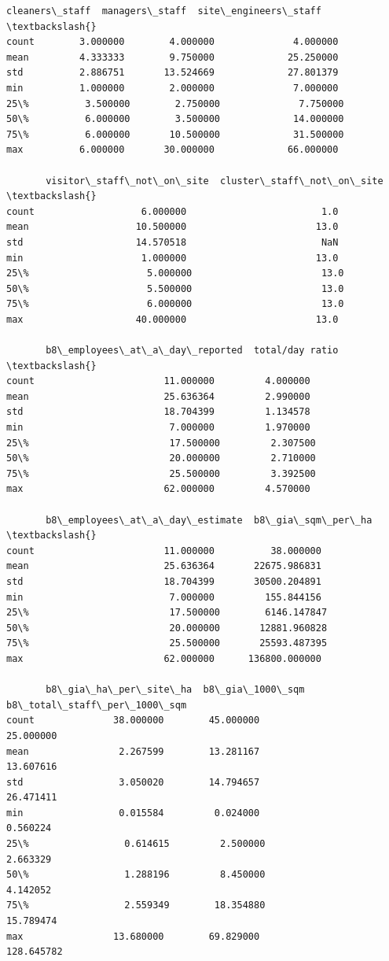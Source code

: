 \documentclass[11pt]{article}
\begin{document}
\begin{tcolorbox}[breakable, size=fbox, boxrule=.5pt, pad at break*=1mm, opacityfill=0]
\begin{Verbatim}[commandchars=\\\{\}]
       cleaners\_staff  managers\_staff  site\_engineers\_staff  \textbackslash{}
count        3.000000        4.000000              4.000000
mean         4.333333        9.750000             25.250000
std          2.886751       13.524669             27.801379
min          1.000000        2.000000              7.000000
25\%          3.500000        2.750000              7.750000
50\%          6.000000        3.500000             14.000000
75\%          6.000000       10.500000             31.500000
max          6.000000       30.000000             66.000000

       visitor\_staff\_not\_on\_site  cluster\_staff\_not\_on\_site  \textbackslash{}
count                   6.000000                        1.0
mean                   10.500000                       13.0
std                    14.570518                        NaN
min                     1.000000                       13.0
25\%                     5.000000                       13.0
50\%                     5.500000                       13.0
75\%                     6.000000                       13.0
max                    40.000000                       13.0

       b8\_employees\_at\_a\_day\_reported  total/day ratio  \textbackslash{}
count                       11.000000         4.000000
mean                        25.636364         2.990000
std                         18.704399         1.134578
min                          7.000000         1.970000
25\%                         17.500000         2.307500
50\%                         20.000000         2.710000
75\%                         25.500000         3.392500
max                         62.000000         4.570000

       b8\_employees\_at\_a\_day\_estimate  b8\_gia\_sqm\_per\_ha  \textbackslash{}
count                       11.000000          38.000000
mean                        25.636364       22675.986831
std                         18.704399       30500.204891
min                          7.000000         155.844156
25\%                         17.500000        6146.147847
50\%                         20.000000       12881.960828
75\%                         25.500000       25593.487395
max                         62.000000      136800.000000

       b8\_gia\_ha\_per\_site\_ha  b8\_gia\_1000\_sqm  b8\_total\_staff\_per\_1000\_sqm
count              38.000000        45.000000                    25.000000
mean                2.267599        13.281167                    13.607616
std                 3.050020        14.794657                    26.471411
min                 0.015584         0.024000                     0.560224
25\%                 0.614615         2.500000                     2.663329
50\%                 1.288196         8.450000                     4.142052
75\%                 2.559349        18.354880                    15.789474
max                13.680000        69.829000                   128.645782
\end{Verbatim}
\end{tcolorbox}
        
\end{document}
